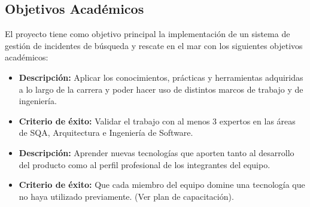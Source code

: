 \subsection{Objetivos Académicos}\label{sec:objetivosAcademicos}

El proyecto tiene como objetivo principal la implementación de un sistema de gestión de incidentes de búsqueda y rescate en el mar con los siguientes objetivos académicos:

\begin{itemize}
    \item \textbf{Descripción:} Aplicar los conocimientos, prácticas y herramientas adquiridas a lo largo de la carrera y poder hacer uso de distintos marcos de trabajo y de ingeniería.
    \item \textbf{Criterio de éxito:} Validar el trabajo con al menos 3 expertos en las áreas de SQA, Arquitectura e Ingeniería de Software.
    \vspace{0.5cm}
    \item \textbf{Descripción:} Aprender nuevas tecnologías que aporten tanto al desarrollo del producto como al perfil profesional de los integrantes del equipo.
    \item \textbf{Criterio de éxito:} Que cada miembro del equipo domine una tecnología que no haya utilizado previamente. (Ver plan de capacitación).
\end{itemize}